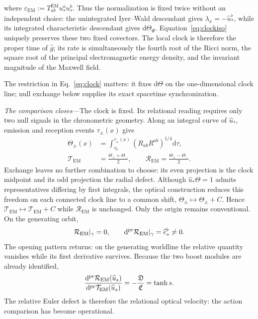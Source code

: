 \documentclass[aps,prl,reprint]{revtex4-2}
\newcommand{\EM}{\mathrm{EM}}
\newcommand{\dd}{\mathrm d}
\begin{document}
where $\varepsilon_{\EM}:=T^{\EM}_{ab}u_*^au_*^b$. Thus the normalization is fixed twice without an independent choice: the unintegrated Iyer--Wald descendant gives $\lambda_x=-\widehat u_*^\flat$, while its integrated characteristic descendant gives $\dd\Theta_\Phi$. Equation~\eqref{eq:clockiso} uniquely preserves these two fixed covectors. The local clock is therefore the proper time of $\widehat g$; its rate is simultaneously the fourth root of the Ricci norm, the square root of the principal electromagnetic energy density, and the invariant magnitude of the Maxwell field.

The restriction in Eq.~\eqref{eq:clock} matters: it fixes $\dd\Theta$ on the one-dimensional clock line; null exchange below supplies its exact spacetime synchronization.

\textit{The comparison closes---}The clock is fixed. Its relational reading requires only two null signals in the chronometric geometry. Along an integral curve of $\widehat u_*$, emission and reception events $\tau_\pm(x)$ give
\begin{equation}
\begin{aligned}
\Theta_\pm(x)&=\int_{\tau_0}^{\tau_\pm(x)}
(R_{ab}R^{ab})^{1/4}\dd\tau,\\
\mathcal T_{\EM}&=\frac{\Theta_++\Theta_-}{2},\qquad
\mathcal R_{\EM}=\frac{\Theta_+-\Theta_-}{2}.
\end{aligned}
\label{eq:radarclock}
\end{equation}
Exchange leaves no further combination to choose: its even projection is the clock midpoint and its odd projection the radial defect. Although $\widehat u_*\Theta=1$ admits representatives differing by first integrals, the optical construction reduces this freedom on each connected clock line to a common shift, $\Theta_\pm\mapsto\Theta_\pm+C$. Hence $\mathcal T_{\EM}\mapsto\mathcal T_{\EM}+C$ while $\mathcal R_{\EM}$ is unchanged. Only the origin remains conventional. On the generating orbit,
\begin{equation}
\mathcal R_{\EM}|_\gamma=0,
\qquad
\dd^{\rm pr}\mathcal R_{\EM}|_\gamma
=\widehat e_*^\flat\neq0 .
\label{eq:radialjet}
\end{equation}
The opening pattern returns: on the generating worldline the relative quantity vanishes while its first derivative survives. Because the two boost modules are already identified,
\begin{equation}
\frac{\dd^{\rm pr}\mathcal R_{\EM}(\widehat u_s)}
{\dd^{\rm pr}\mathcal T_{\EM}(\widehat u_s)}
=-\frac{\mathfrak D}{\mathfrak C}=\tanh s .
\label{eq:defectvelocity}
\end{equation}
The relative Euler defect is therefore the relational optical velocity: the action comparison has become operational.
\end{document}
